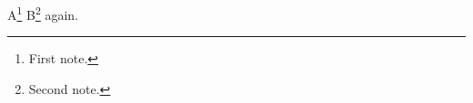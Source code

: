 \documentclass{article}
\begin{document}
A\footnote{First note.\label{fa}} B\footnote{Second note.} again.
\end{document}
